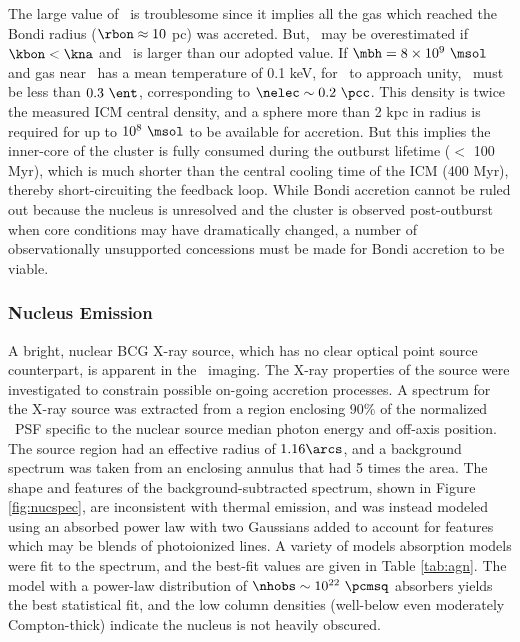 \documentclass[11pt, preprint]{aastex}
\begin{document}
The large value of \dmb\ is troublesome since it implies all the gas
which reached the Bondi radius ($\rbon \approx 10$ pc) was
accreted. But, \dmb\ may be overestimated if $\kbon < \kna$ and
\mbh\ is larger than our adopted value. If $\mbh = 8 \times 10^9
~\msol$ and gas near \rbon\ has a mean temperature of 0.1 keV, for
\dmb\ to approach unity, \kbon\ must be less than $0.3 ~\ent$,
corresponding to $\nelec \sim 0.2 ~\pcc$. This density is twice the
measured ICM central density, and a sphere more than 2 kpc in radius
is required for up to $10^8 ~\msol$ to be available for accretion. But
this implies the inner-core of the cluster is fully consumed during
the outburst lifetime ($<$ 100 Myr), which is much shorter than the
central cooling time of the ICM (400 Myr), thereby short-circuiting
the feedback loop. While Bondi accretion cannot be ruled out because
the nucleus is unresolved and the cluster is observed post-outburst
when core conditions may have dramatically changed, a number of
observationally unsupported concessions must be made for Bondi
accretion to be viable.

\subsubsection{Nucleus Emission}

A bright, nuclear BCG X-ray source, which has no clear optical point
source counterpart, is apparent in the \cxo\ imaging. The X-ray
properties of the source were investigated to constrain possible
on-going accretion processes. A spectrum for the X-ray source was
extracted from a region enclosing 90\% of the normalized \cxo\ PSF
specific to the nuclear source median photon energy and off-axis
position. The source region had an effective radius of $1.16\arcs$,
and a background spectrum was taken from an enclosing annulus that had
5 times the area. The shape and features of the background-subtracted
spectrum, shown in Figure \ref{fig:nucspec}, are inconsistent with
thermal emission, and was instead modeled using an absorbed power law
with two Gaussians added to account for features which may be blends
of photoionized lines. A variety of models absorption models were fit
to the spectrum, and the best-fit values are given in Table
\ref{tab:agn}. The model with a power-law distribution of $\nhobs \sim
10^{22} ~\pcmsq$ absorbers yields the best statistical fit, and the
low column densities (well-below even moderately Compton-thick)
indicate the nucleus is not heavily obscured.
\end{document}
